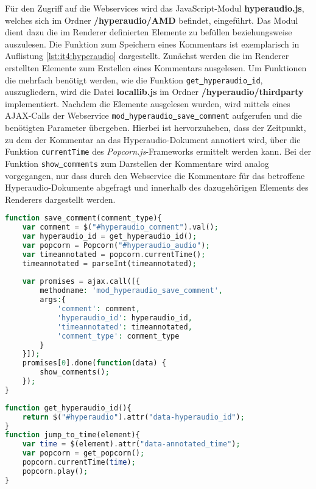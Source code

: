 Für den Zugriff auf die Webservices wird das JavaScript-Modul \textbf{hyperaudio.js}, welches sich im Ordner \textbf{/hyperaudio/AMD} befindet, eingeführt. Das Modul dient dazu die im Renderer definierten Elemente zu befüllen beziehungsweise auszulesen.
Die Funktion zum Speichern eines Kommentars ist exemplarisch in Auflistung \ref{lst:it4:hyperaudio} dargestellt. Zunächst werden die im Renderer erstellten Elemente zum Erstellen eines Kommentars ausgelesen. Um Funktionen die mehrfach benötigt werden, wie die Funktion \texttt{get\underline{{ }}hyperaudio\underline{{ }}id},  auszugliedern, wird die Datei \textbf{locallib.js} im Ordner \textbf{/hyperaudio/thirdparty} implementiert. Nachdem die Elemente ausgelesen wurden, wird mittels eines AJAX-Calls der Webservice \texttt{mod\underline{{ }}hyperaudio\underline{{ }}save\underline{{ }}comment} aufgerufen und die benötigten Parameter übergeben. Hierbei ist hervorzuheben, dass der Zeitpunkt, zu dem der Kommentar an das Hyperaudio-Dokument annotiert wird, über die Funktion \texttt{currentTime} des \textit{Popcorn.js}-Frameworks ermittelt werden kann. Bei der Funktion \texttt{show\underline{{ }}comments} zum Darstellen der Kommentare wird analog vorgegangen, nur dass durch den Webservice die Kommentare für das betroffene Hyperaudio-Dokumente abgefragt und innerhalb des dazugehörigen Elements des Renderers dargestellt werden.


\begin{lstlisting}[language=php,
             linewidth=\textwidth,
             caption={Ausschnitt der \textbf{hyperaudio.js} in der 4. Iteration},
             label={lst:it4:hyperaudio}]
function save_comment(comment_type){
    var comment = $("#hyperaudio_comment").val();
    var hyperaudio_id = get_hyperaudio_id();
    var popcorn = Popcorn("#hyperaudio_audio");
    var timeannotated = popcorn.currentTime();
    timeannotated = parseInt(timeannotated);
	    
    var promises = ajax.call([{
        methodname: 'mod_hyperaudio_save_comment',
        args:{
            'comment': comment,
            'hyperaudio_id': hyperaudio_id,       
            'timeannotated': timeannotated,
            'comment_type': comment_type
        }
    }]);
    promises[0].done(function(data) {
        show_comments();
    });
}
\end{lstlisting}

\begin{lstlisting}[language=php,
             linewidth=\textwidth,
             caption={Ausschnitt der \textbf{locallib.js} in der 4. Iteration},
             label={lst:it4:locallib.js}]
function get_hyperaudio_id(){
    return $("#hyperaudio").attr("data-hyperaudio_id");
}
function jump_to_time(element){
    var time = $(element).attr("data-annotated_time");
    var popcorn = get_popcorn();
    popcorn.currentTime(time);
    popcorn.play();
}
\end{lstlisting}

